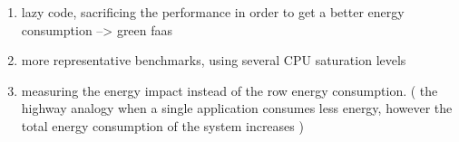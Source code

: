 \begin{enumerate}

      \item lazy code, sacrificing the performance in order to get a better energy consumption --> green faas
      \item more representative benchmarks, using several CPU saturation levels
      \item measuring the energy impact instead of the row energy consumption. ( the highway analogy when a single application consumes less energy, however the total energy consumption of the system increases )
\end{enumerate}
\vfill \strut  %
\cleardoublepage